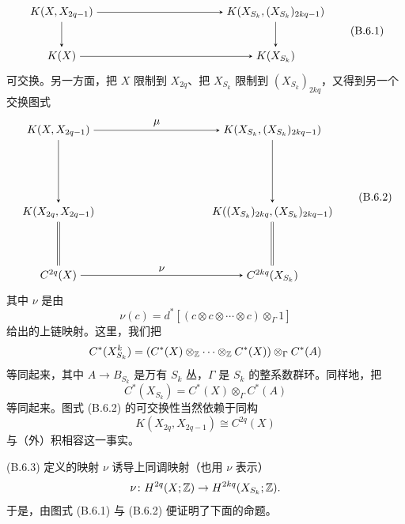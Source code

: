 \begin{equation}
  \begin{tikzpicture}[>=stealth, baseline=(current bounding box.center)]
    \node (A1) at (0,1.4) {$K(X,X_{2q-1})$};
    \node (B1) at (6.8,1.4) {$K(X_{S_k},(X_{S_k})_{2kq-1})$};
    \node (A2) at (0,0) {$K(X)$};
    \node (B2) at (6.8,0) {$K(X_{S_k})$};
    \draw[->] (A1) -- (B1);
    \draw[->] (A1) -- (A2);
    \draw[->] (B1) -- (B2);
    \draw[->] (A2) -- (B2);
  \end{tikzpicture}
  \tag{B.6.1}
\end{equation}
可交换。另一方面，把 $X$ 限制到 $X_{2q}$、把 $X_{S_k}$ 限制到 $(X_{S_k})_{2kq}$，又得到另一个交换图式
\begin{equation}
  \begin{tikzpicture}[>=stealth, baseline=(current bounding box.center)]
    \node (A1) at (0,2.6) {$K(X,X_{2q-1})$};
    \node (B1) at (6.8,2.6) {$K(X_{S_k},(X_{S_k})_{2kq-1})$};
    \node (A2) at (0,0) {$K(X_{2q},X_{2q-1})$};
    \node (B2) at (6.8,0) {$K((X_{S_k})_{2kq},(X_{S_k})_{2kq-1})$};
    \node (A3) at (0,-2.0) {$C^{2q}(X)$};
    \node (B3) at (6.8,-2.0) {$C^{2kq}(X_{S_k})$};
    \draw[->] (A1) -- node[above] {$\mu$} (B1);
    \draw[->] (A1) -- (A2);
    \draw[->] (B1) -- (B2);
    \draw[double, double distance=1.6pt] (A2) -- (A3);
    \draw[double, double distance=1.6pt] (B2) -- (B3);
    \draw[->] (A3) -- node[above] {$\nu$} (B3);
  \end{tikzpicture}
  \tag{B.6.2}
\end{equation}
其中 $\nu$ 是由
\begin{equation}
  \nu(c)=d^*[(c\otimes c\otimes\cdots\otimes c)\otimes_\Gamma1] \tag{B.6.3}
\end{equation}
给出的上链映射。这里，我们把
\[
  C^*(X^k_{S_k})=(C^*(X)\otimes_{\mathbb{Z}}\cdots\otimes_{\mathbb{Z}} C^*(X))\otimes_\Gamma C^*(A)
\]
等同起来，其中 $A\to B_{S_k}$ 是万有 $S_k$ 丛，$\Gamma$ 是 $S_k$ 的整系数群环。同样地，把
\[
  C^*(X_{S_k})=C^*(X)\otimes_\Gamma C^*(A)
\]
等同起来。图式 (B.6.2) 的可交换性当然依赖于同构
\[
  K(X_{2q},X_{2q-1})\cong C^{2q}(X)
\]
与（外）积相容这一事实。


(B.6.3) 定义的映射 $\nu$ 诱导上同调映射（也用 $\nu$ 表示）
\[
  \nu\colon H^{2q}(X;\mathbb{Z})\to H^{2kq}(X_{S_k};\mathbb{Z}).
\]
于是，由图式 (B.6.1) 与 (B.6.2) 便证明了下面的命题。

